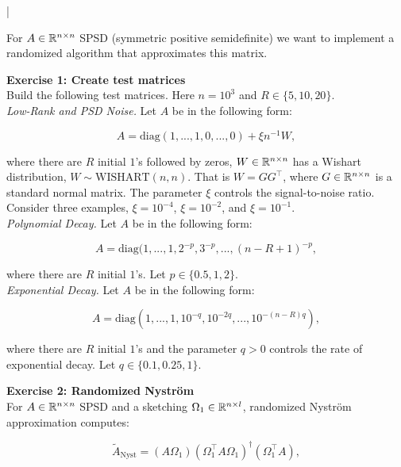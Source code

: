 \documentclass[11pt]{article}
\begin{document}
\lstset{frameround=fttt,language=Matlab}

\lstMakeShortInline[columns=fixed]|


For $A \in \mathbb{R}^{n \times n}$ SPSD (symmetric positive semidefinite) we want to implement a randomized algorithm that approximates this matrix.

\bigskip

{\bf{Exercise 1: Create test matrices}} \\

Build the following test matrices. Here $n = 10^3$ and $R \in \{5, 10, 20\}$. \\

\textit{Low-Rank and PSD Noise.} Let $A$ be in the following form:

\[ A = \text{diag}(1, ..., 1, 0, ..., 0) + \xi n^{-1}W, \]

where there are $R$ initial $1$'s followed by zeros, $W \in \mathbb{R}^{n \times n}$ has a Wishart distribution, $W \sim \text{WISHART}(n, n)$. That is $W = GG^{\top}$, where $G \in \mathbb{R}^{n \times n}$ is a standard normal matrix. The parameter $\xi$ controls the signal-to-noise ratio. Consider three examples, $\xi = 10^{-4}$, $\xi = 10^{-2}$, and $\xi = 10^{-1}$. \\

\textit{Polynomial Decay.} Let $A$ be in the following form:

\[ A = \text{diag}(1, ..., 1, 2^{-p}, 3^{-p}, ..., (n-R+1)^{-p}, \]

where there are $R$ initial $1$'s. Let $p \in \{0.5, 1, 2\}$. \\

\textit{Exponential Decay.} Let $A$ be in the following form:

\[ A = \text{diag}(1, ..., 1, 10^{-q}, 10^{-2q}, ..., 10^{-(n - R)q}), \]

where there are $R$ initial $1$'s and the parameter $q > 0$ controls the rate of exponential decay. Let $q \in \{ 0.1, 0.25, 1\}$.

\bigskip

{\bf{Exercise 2: Randomized Nyström}} \\

For $A \in \mathbb{R}^{n \times n}$ SPSD and a sketching $\Omega_1 \in \mathbb{R}^{n \times l}$, randomized Nyström approximation computes:

\[ \tilde{A}_{\text{Nyst}} = (A \Omega_1)(\Omega_1^{\top} A \Omega_1 )^{\dagger} (\Omega_1^{\top}A), \]
\end{document}
